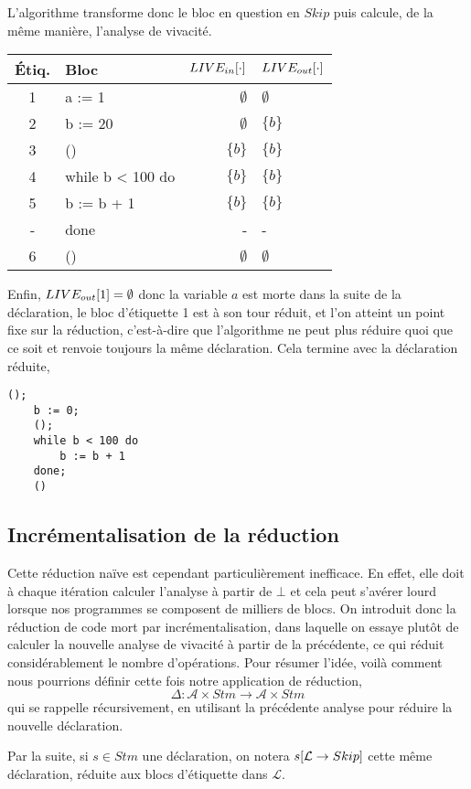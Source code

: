 \documentclass[a4paper, 11pt]{article}
\begin{document}
L'algorithme transforme donc le bloc en question en $Skip$ puis calcule, de la même manière, l'analyse de vivacité.
\begin{center}
	\begin{tabular}{||c|l|r|l||}
	\hline
	Étiq. & Bloc & $LIVE_{in}[\cdot]$ & $LIVE_{out}[\cdot]$ \\
	\hline
	1 & a := 1 & $\emptyset$ & $\emptyset$\\
	2 & b := 20 & $\emptyset$ & $\{b\}$\\
	3 & () & $\{b\}$ & $\{b\}$\\
	4 & while b < 100 do & $\{b\}$ & $\{b\}$\\
	5 & b := b + 1 & $\{b\}$ & $\{b\}$\\
	- & done & - & -\\
	6 & () & $\emptyset$ & $\emptyset$\\
	\hline
	\end{tabular}
\end{center}
Enfin, $LIVE_{out}[1] = \emptyset$ donc la variable $a$ est morte dans la suite de la déclaration, le bloc d'étiquette 1 est à son tour
réduit, et l'on atteint un point fixe sur la réduction, c'est-à-dire que l'algorithme ne peut plus réduire quoi que ce soit et renvoie
toujours la même déclaration. Cela termine avec la déclaration réduite,
\begin{lstlisting}[tabsize=2]
	();
	b := 0;
	();
	while b < 100 do
		b := b + 1
	done;
	()
\end{lstlisting}
\subsection{Incrémentalisation de la réduction}
Cette réduction naïve est cependant particulièrement inefficace. En effet, elle doit à chaque itération calculer
l'analyse à partir de $\bot$ et cela peut s'avérer lourd lorsque nos programmes se composent de milliers de blocs.
On introduit donc la réduction de code mort par incrémentalisation, dans laquelle on essaye plutôt de calculer
la nouvelle analyse de vivacité à partir de la précédente, ce qui réduit considérablement le nombre d'opérations.
Pour résumer l'idée, voilà comment nous pourrions définir cette fois notre application de réduction,
\[\Delta : \mathcal{A} \times Stm \longrightarrow \mathcal{A} \times Stm \]
qui se rappelle récursivement, en utilisant la précédente analyse pour réduire la nouvelle déclaration.
\\
\begin{notation}
	Par la suite, si $s \in Stm$ une déclaration, on notera $s[\mathcal{L} \rightarrow{Skip}]$ cette même déclaration, 
	réduite aux blocs d'étiquette dans $\mathcal{L}$.
\end{notation}
\end{document}
